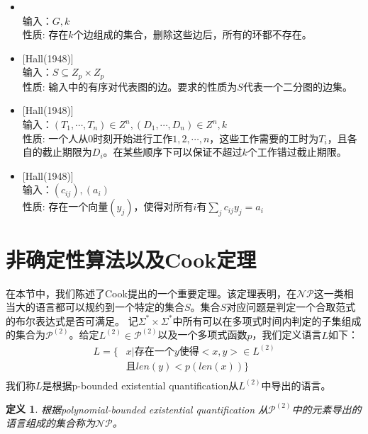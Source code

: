 \documentclass[twocolumn]{article}
\newtheorem{definition}{\hspace{2em}定义}
\theoremstyle{nonumberplain}%
\begin{document}
\begin{CJK}{UTF8}{gbsn}
\begin{itemize}
    \item {}\\
    输入：$G, k$\\
    性质: 存在$k$个边组成的集合，删除这些边后，所有的环都不存在。

    \item {}[Hall(1948)]\\
    输入：$S\subseteq Z_p \times Z_p $\\
    性质: 输入中的有序对代表图的边。要求的性质为$S$代表一个二分图的边集。

    \item {}[Hall(1948)]\\
    输入：$(T_1,\cdots,T_n)\in Z^n, (D_1,\cdots,D_n)\in Z^n, k$\\
    性质: 一个人从0时刻开始进行工作$1,2,\cdots,n$，这些工作需要的工时为$T_i$，且各自的截止期限为$D_i$。在某些顺序下可以保证不超过$k$个工作错过截止期限。

    \item {}[Hall(1948)]\\
    输入：$(c_{ij}), (a_i)$\\
    性质: 存在一个向量$(y_j)$，使得对所有$i$有$\sum_j c_{ij}y_j = a_i$
    \end{itemize}

\section{非确定性算法以及Cook定理}
    在本节中，我们陈述了Cook提出的一个重要定理。该定理表明，在$\mathcal{NP}$这一类相当大的语言都可以规约到一个特定的集合$S$。集合$S$对应问题是判定一个合取范式的布尔表达式是否可满足。
    记$\Sigma^*\times\Sigma^*$中所有可以在多项式时间内判定的子集组成的集合为$\mathcal{P}^{(2)}$。给定$L^{(2)}\in \mathcal{P}^{(2)}$以及一个多项式函数$p$，我们定义语言$L$如下：
    \begin{equation}\nonumber
        \begin{aligned}
            L=\{&x|\text{存在一个}y\text{使得}<x,y>\in L^{(2)} \\
                &\text{且}len(y)<p(len(x))\} \\
        \end{aligned}
    \end{equation}
    我们称$L$是根据p-bounded existential quantification从$L^{(2)}$中导出的语言。

    \begin{definition}
        根据polynomial-bounded existential quantification 从$\mathcal{P}^{(2)}$中的元素导出的语言组成的集合称为$\mathcal{NP}$。
    \end{definition}


\end{CJK}
\end{document}
